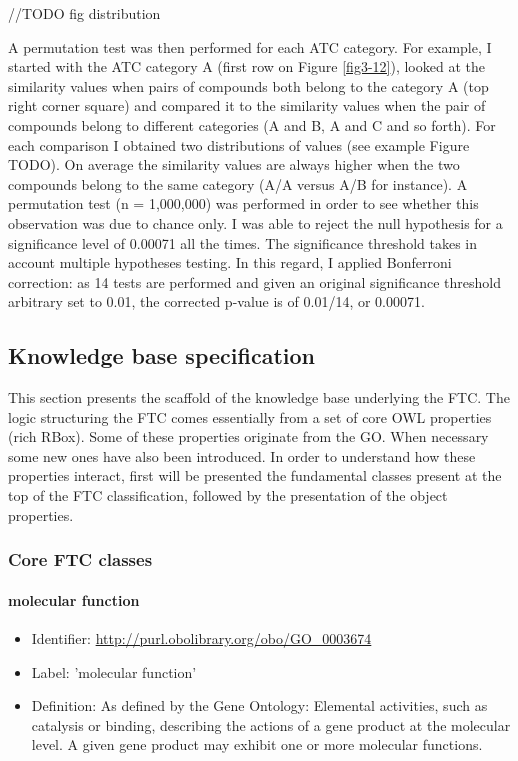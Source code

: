 //TODO fig distribution


A permutation test was then performed for each ATC category. For example, I started with the ATC category A (first row on Figure \ref{fig3-12}), looked at the similarity values when pairs of compounds both belong to the category A (top right corner square) and compared it to the similarity values when the pair of compounds belong to different categories (A and B, A and C and so forth). For each comparison I obtained two distributions of values (see example Figure TODO). On average the similarity values are always higher when the two compounds belong to the same category (A/A versus A/B for instance). A permutation test (n = 1,000,000) was performed in order to see whether this observation was due to chance only. I was able to reject the null hypothesis for a significance level of 0.00071 all the times.
The significance threshold takes in account multiple hypotheses testing. In this regard, I applied Bonferroni correction: as 14 tests are performed and given an original significance threshold arbitrary set to 0.01, the corrected p-value is of 0.01/14, or 0.00071.

\subsection{Knowledge base specification}
\label{specskb}

This section presents the scaffold of the knowledge base underlying the FTC. The logic structuring the FTC comes essentially from a set of core OWL properties (rich RBox). Some of these properties originate from the GO. When necessary some new ones have also been introduced. In order to understand how these properties interact, first will be presented the fundamental classes present at the top of the FTC classification, followed by the presentation of the object properties.

\subsubsection{Core FTC classes}

\paragraph{molecular function}
\begin{itemize}
  \item Identifier: \url{http://purl.obolibrary.org/obo/GO\_0003674}
  \item Label: 'molecular function'
  \item Definition: As defined by the Gene Ontology: Elemental activities, such as catalysis or binding, describing the actions of a gene product at the molecular level. A given gene product may exhibit one or more molecular functions.
\end{itemize}

